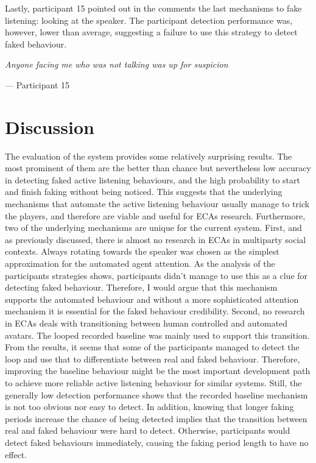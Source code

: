 \documentclass[]{simple-thesis}
\begin{document}
Lastly, participant 15 pointed out in the comments the last mechanisms to fake listening: looking at the speaker.
The participant detection performance was, however, lower than average, suggesting a failure to use this strategy to detect faked behaviour.

\begin{displayquote}
  \textit{Anyone facing me who was not talking was up for suspicion}

  \hfill
  --- Participant 15
\end{displayquote}

\section{Discussion}

The evaluation of the system provides some relatively surprising results.
The most prominent of them are the better than chance but nevertheless low accuracy in detecting faked active listening behaviours, and the high probability to start and finish faking without being noticed.
This suggests that the underlying mechanisms that automate the active listening behaviour usually manage to trick the players, and therefore are viable and useful for ECAs research.
Furthermore, two of the underlying mechanisms are unique for the current system.
First, and as previously discussed, there is almost no research in ECAs in multiparty social contexts.
Always rotating towards the speaker was chosen as the simplest approximation for the automated agent attention.
As the analysis of the participants strategies shows, participants didn't manage to use this as a clue for detecting faked behaviour.
Therefore, I would argue that this mechanism supports the automated behaviour and without a more sophisticated attention mechanism it is essential for the faked behaviour credibility.
Second, no research in ECAs deals with transitioning between human controlled and automated avatars.
The looped recorded baseline was mainly used to support this transition.
From the results, it seems that some of the participants managed to detect the loop and use that to differentiate between real and faked behaviour.
Therefore, improving the baseline behaviour might be the most important development path to achieve more reliable active listening behaviour for similar systems.
Still, the generally low detection performance shows that the recorded baseline mechanism is not too obvious nor easy to detect.
In addition, knowing that longer faking periods increase the chance of being detected implies that the transition between real and faked behaviour were hard to detect.
Otherwise, participants would detect faked behaviours immediately, causing the faking period length to have no effect.
\end{document}
